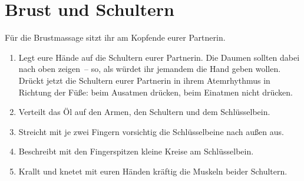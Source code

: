 \section{Brust und Schultern}

Für die Brustmassage sitzt ihr am Kopfende eurer Partnerin.

\begin{enumerate}
  \item {} Legt eure Hände auf die Schultern eurer Partnerin. Die Daumen sollten dabei nach oben zeigen~-- so, als würdet ihr jemandem die Hand geben wollen. Drückt jetzt die Schultern eurer Partnerin in ihrem Atemrhythmus in Richtung der Füße: beim Ausatmen drücken, beim Einatmen nicht drücken.
  \item {} Verteilt das Öl auf den Armen, den Schultern und dem Schlüsselbein.
  \item {} Streicht mit je zwei Fingern vorsichtig die Schlüsselbeine nach außen aus.
  \item {} Beschreibt mit den Fingerspitzen kleine Kreise am Schlüsselbein.
  \item {} Krallt und knetet mit euren Händen kräftig die Muskeln beider Schultern.
\end{enumerate}
